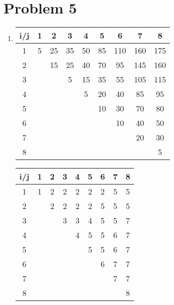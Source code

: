 \documentclass[12pt,a4paper]{article}
\begin{document}
\newpage
\section*{Problem 5}
	\begin{enumerate}[label=(\alph*)]
		\item 
		\begin{minipage}{0.53\linewidth}
			\begin{tabular}{|c||c|c|c|c|c|c|c|c|}
				\hline
				i/j & 1 & 2 & 3 & 4 & 5 & 6 & 7 & 8 \\\hline\hline
				1 	& 5 & 25& 35& 50& 85&110&160&175\\\hline
				2 	& 	& 15& 25& 40& 70& 95&145&160\\\hline
				3 	& 	&  	& 5 & 15& 35& 55&105&115\\\hline
				4 	& 	& 	& 	& 5 & 20& 40& 85& 95\\\hline
				5 	& 	& 	& 	& 	& 10& 30& 70& 80\\\hline
				6 	& 	& 	& 	& 	& 	& 10& 40& 50\\\hline
				7 	& 	& 	& 	& 	& 	& 	& 20& 30\\\hline
				8 	& 	& 	& 	& 	& 	& 	& 	& 5 \\\hline
			\end{tabular}
		\end{minipage}
		\begin{minipage}{0.45\linewidth}
			\begin{tabular}{|c||c|c|c|c|c|c|c|c|}
				\hline
				i/j & 1 & 2 & 3 & 4 & 5 & 6 & 7 & 8 \\\hline\hline
				1 	& 1 & 2	& 2	& 2	& 2	& 2	& 5	& 5\\\hline
				2 	& 	& 2	& 2	& 2	& 2	& 5	& 5	& 5\\\hline
				3 	& 	& 	& 3	& 3	& 4	& 5	& 5	& 7\\\hline
				4 	& 	& 	& 	& 4	& 5	& 5	& 6	& 7\\\hline
				5 	& 	& 	& 	& 	& 5	& 5	& 6	& 7\\\hline
				6 	& 	& 	& 	& 	& 	& 6	& 7	& 7\\\hline
				7 	& 	& 	& 	& 	& 	& 	& 7	& 7\\\hline
				8 	& 	& 	& 	& 	& 	& 	& 	& 8\\\hline
			\end{tabular}
		\end{minipage}




\end{enumerate}
\end{document}
